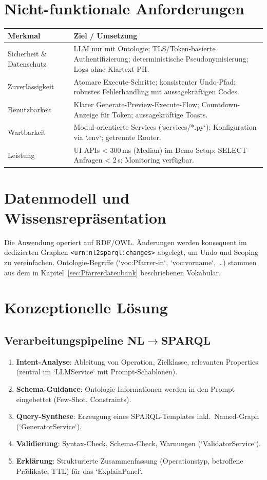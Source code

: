 \section{Nicht-funktionale Anforderungen}
\begin{center}
\begin{tabular}{p{}p{}}
\toprule
\textbf{Merkmal} & \textbf{Ziel / Umsetzung} \\
\midrule
Sicherheit \& Datenschutz & LLM nur mit Ontologie; TLS/Token-basierte Authentifizierung; deterministische Pseudonymisierung; Logs ohne Klartext-PII. \\
Zuverlässigkeit & Atomare Execute-Schritte; konsistenter Undo-Pfad; robustes Fehlerhandling mit aussagekräftigen Codes. \\
Benutzbarkeit & Klarer Generate-Preview-Execute-Flow; Countdown-Anzeige für Token; aussagekräftige Toasts. \\
Wartbarkeit & Modul-orientierte Services (`services/*.py`); Konfiguration via `.env`; getrennte Router. \\
Leistung & UI-APIs \textless{} 300\,ms (Median) im Demo-Setup; SELECT-Anfragen \textless{} 2\,s; Monitoring verfügbar. \\
\bottomrule
\end{tabular}
\end{center}

\section{Datenmodell und Wissensrepräsentation}
Die Anwendung operiert auf RDF/OWL. Änderungen werden konsequent im dedizierten Graphen \texttt{<urn:nl2sparql:changes>} abgelegt, um Undo und Scoping zu vereinfachen. Ontologie-Begriffe (`voc:Pfarrer-in`, `voc:vorname`, …) stammen aus dem in Kapitel~\ref{sec:Pfarrerdatenbank} beschriebenen Vokabular.

\section{Konzeptionelle Lösung}

\subsection{Verarbeitungspipeline NL\texorpdfstring{$\rightarrow$}{→}SPARQL}
\begin{enumerate}
  \item \textbf{Intent-Analyse}: Ableitung von Operation, Zielklasse, relevanten Properties (zentral im `LLMService` mit Prompt-Schablonen).
  \item \textbf{Schema-Guidance}: Ontologie-Informationen werden in den Prompt eingebettet (Few-Shot, Constraints).
  \item \textbf{Query-Synthese}: Erzeugung eines SPARQL-Templates inkl.\ Named-Graph (`GeneratorService`).
  \item \textbf{Validierung}: Syntax-Check, Schema-Check, Warnungen (`ValidatorService`).
  \item \textbf{Erklärung}: Strukturierte Zusammenfassung (Operationstyp, betroffene Prädikate, TTL) für das `ExplainPanel`.
\end{enumerate}

